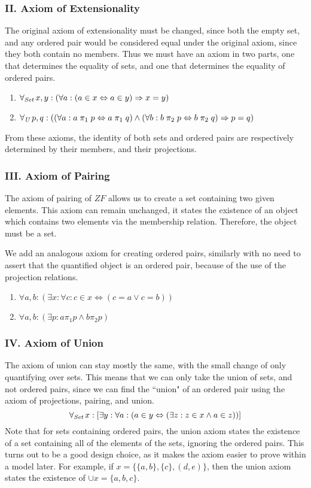 \documentclass[11pt]{report}
\newcommand{\all}[1]{\forall_{\mathit{#1}}\hspace{0.5mm}}
\newcommand{\pleft}{\mathrel{\pi_1}}
\newcommand{\pright}{\mathrel{\pi_2}}
\theoremstyle{definition}
\theoremstyle{theorem}
\theoremstyle{lemma}
\begin{document}
\subsubsection*{II. Axiom of Extensionality}
The original axiom of extensionality must be changed, since both the empty set, and any ordered pair would be considered equal under the original axiom, since they both contain no members.
Thus we must have an axiom in two parts, one that determines the equality of sets, and one that determines the equality of ordered pairs.
\begin{enumerate}[label=(\roman*)]
\item $\all{Set} x,y:
        (\forall a:
          (a\in x \Leftrightarrow a\in y) \Rightarrow x=y)$
\item $\all{U} p,q: ((\forall a: a\pleft p \Leftrightarrow a\pleft q)
             \wedge (\forall b: b\pright p \Leftrightarrow b\pright q)
             \Rightarrow p=q)$
\end{enumerate}
From these axioms, the identity of both sets and ordered pairs are respectively determined by their members, and their projections. 

\subsubsection*{III. Axiom of Pairing}
The axiom of pairing of $\mathit{ZF}$ allows us to create a set containing two given elements.
This axiom can remain unchanged, it states the existence of an object which contains two elements via the membership relation.
Therefore, the object must be a set.

We add an analogous axiom for creating ordered pairs, similarly with no need to assert that the quantified object is an ordered pair, because of the use of the projection relations.
\begin{enumerate}[label=(\roman*)]
\item $\forall a,b: (\exists x: \forall c:
          c\in x \Leftrightarrow (c=a \vee c=b))$
\item $\forall a,b: (\exists p: a\pleft p \wedge b\pright p)$
\end{enumerate}

\subsubsection*{IV. Axiom of Union}
The axiom of union can stay mostly the same, with the small change of only quantifying over sets.
This means that we can only take the union of sets, and not ordered pairs, since we can find the ``union" of an ordered pair using the axiom of projections, pairing, and union.
$$\all{Set}x: [\exists y:\forall a:
    (a\in y \Leftrightarrow (\exists z: z\in x \wedge a\in z))]$$
Note that for sets containing ordered pairs, the union axiom states the existence of a set containing all of the elements of the sets, ignoring the ordered pairs.
This turns out to be a good design choice, as it makes the axiom easier to prove within a model later.
For example, if $x=\{\{a,b\},\{c\},(d,e)\}$, then the union axiom states the existence of $\cup x=\{a,b,c\}$.
\end{document}
